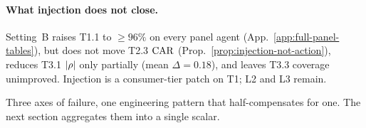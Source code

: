 \paragraph{What injection does not close.}
Setting~B raises T1.1 to $\geq 96\%$ on every panel agent (App.~\ref{app:full-panel-tables}), but does not move T2.3 $\mathrm{CAR}$ (Prop.~\ref{prop:injection-not-action}), reduces T3.1 $|\rho|$ only partially (mean $\Delta = 0.18$), and leaves T3.3 coverage unimproved. Injection is a consumer-tier patch on T1; L2 and L3 remain.

Three axes of failure, one engineering pattern that half-compensates for one. The next section aggregates them into a single scalar.
